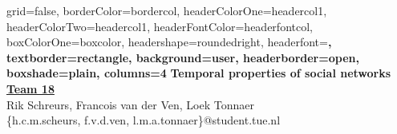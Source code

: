 \documentclass[archE1,portrait,draft]{baposter}
\begin{document}
\background{ %

}

\begin{poster}{
grid=false,
borderColor=bordercol, %
headerColorOne=headercol1, %
headerColorTwo=headercol1, %
headerFontColor=headerfontcol, %
boxColorOne=boxcolor, %
headershape=roundedright, %
headerfont=\Large\sf\bf, %
textborder=rectangle,
background=user,
headerborder=open, %
boxshade=plain,
columns=4
}
{}
%
%
{
\sf\bf Temporal properties of social networks} %
{
\vspace{1em} {\LARGE\bf \underline{Team 18}}\\
Rik Schreurs, Francois van der Ven, Loek Tonnaer\\ %
{\smaller \{h.c.m.scheurs, f.v.d.ven, l.m.a.tonnaer\}@student.tue.nl}\\
\vspace{1em}
} %
%


\end{poster}
\end{document}
